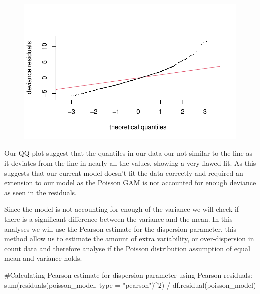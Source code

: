 \documentclass[
  letterpaper,
  DIV=11,
  numbers=noendperiod]{scrartcl}
\newenvironment{Shaded}{\begin{snugshade}}{\end{snugshade}}
\newcommand{\AttributeTok}[1]{\textcolor[rgb]{0.40,0.45,0.13}{#1}}
\newcommand{\CommentTok}[1]{\textcolor[rgb]{0.37,0.37,0.37}{#1}}
\newcommand{\DecValTok}[1]{\textcolor[rgb]{0.68,0.00,0.00}{#1}}
\newcommand{\FunctionTok}[1]{\textcolor[rgb]{0.28,0.35,0.67}{#1}}
\newcommand{\NormalTok}[1]{\textcolor[rgb]{0.00,0.23,0.31}{#1}}
\newcommand{\SpecialCharTok}[1]{\textcolor[rgb]{0.37,0.37,0.37}{#1}}
\newcommand{\StringTok}[1]{\textcolor[rgb]{0.13,0.47,0.30}{#1}}
\begin{document}
\begin{figure}[H]

{\centering \includegraphics{Group34Coursework_files/figure-pdf/unnamed-chunk-9-13.pdf}

}

\end{figure}

Our QQ-plot suggest that the quantiles in our data our not similar to
the line as it deviates from the line in nearly all the values, showing
a very flawed fit. As this suggests that our current model doesn't fit
the data correctly and required an extension to our model as the Poisson
GAM is not accounted for enough deviance as seen in the residuals.

Since the model is not accounting for enough of the variance we will
check if there is a significant difference between the variance and the
mean. In this analyses we will use the Pearson estimate for the
dispersion parameter, this method allow us to estimate the amount of
extra variability, or over-dispersion in count data and therefore
analyse if the Poisson distribution assumption of equal mean and
variance holds.

\begin{Shaded}
\begin{Highlighting}[]
\CommentTok{\#Calculating Pearson estimate for dispersion parameter using Pearson residuals:}
\FunctionTok{sum}\NormalTok{(}\FunctionTok{residuals}\NormalTok{(poisson\_model, }\AttributeTok{type =} \StringTok{"pearson"}\NormalTok{)}\SpecialCharTok{\^{}}\DecValTok{2}\NormalTok{) }\SpecialCharTok{/} \FunctionTok{df.residual}\NormalTok{(poisson\_model)}
\end{Highlighting}
\end{Shaded}
\end{document}
